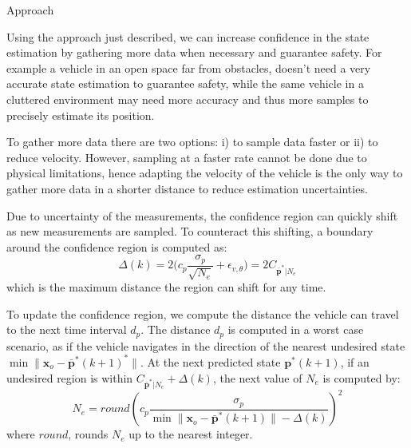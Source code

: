 \begin{section}{Approach}

Using the approach just  described, we can increase confidence in the state estimation by gathering more data when necessary and guarantee safety. For example a vehicle in an open space far from obstacles, doesn't need a very accurate state estimation to guarantee safety, while the same vehicle in a cluttered environment may need more accuracy and thus more samples to precisely estimate its position.


To gather more data there are two options: i) to sample data faster or ii) to reduce velocity. However, sampling at a faster rate cannot be done due to physical limitations, hence adapting the velocity of the vehicle is the only way to gather more data in a shorter distance to reduce estimation uncertainties. 

Due to uncertainty of the measurements, the confidence region can quickly shift as new measurements are sampled. To counteract this shifting, a boundary around the confidence region is computed as:
    \begin{equation}
    \label{eq:Delta}
	    \Delta(k) = 2\big(c_p\frac{\sigma_p}{\sqrt{N_e}} + \epsilon_{v,\theta}\big) = 2C_{\bar{\bm{p}}^*|N_e}
	\end{equation}
which is the maximum distance the region can shift for any time.

To update the confidence region, we compute the distance the vehicle can travel to the next time interval $d_p$. The distance $d_p$ is computed in a worst case scenario, as if the vehicle navigates in the direction of the nearest undesired state $\min \lVert \bm{x}_o - \bar{\bm{p}}^*(k+1)^* \rVert$. At the next predicted state $\bm{p}^*(k+1)$, if an undesired region is within $C_{\bar{\bm{p}}^*|N_e} + \Delta(k)$, the next value of $N_e$ is computed by:
    \begin{equation}
    \label{eq:N_e}
	    N_e = round \left(c_p \frac{ \sigma_p }{ {\min \lVert \bm{x}_o - \bar{\bm{p}}^*(k+1) \rVert} -\Delta(k) } \right)^2
	\end{equation}
where $round$, rounds $N_e$ up to the nearest integer.


\end{section}
